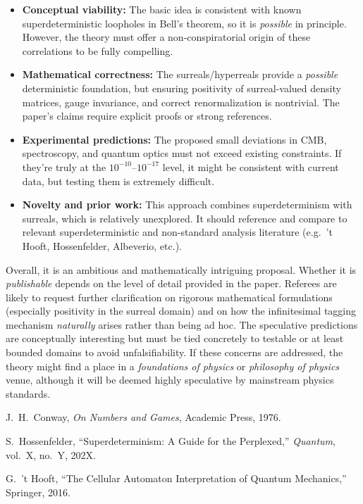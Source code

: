 \documentclass[11pt]{article}
\begin{document}
\begin{itemize}
  \item \textbf{Conceptual viability:} The basic idea is consistent with known superdeterministic loopholes in Bell’s theorem, so it is \emph{possible} in principle. However, the theory must offer a non-conspiratorial origin of these correlations to be fully compelling.
  \item \textbf{Mathematical correctness:} The surreals/hyperreals provide a \emph{possible} deterministic foundation, but ensuring positivity of surreal-valued density matrices, gauge invariance, and correct renormalization is nontrivial. The paper’s claims require explicit proofs or strong references.
  \item \textbf{Experimental predictions:} The proposed small deviations in CMB, spectroscopy, and quantum optics must not exceed existing constraints. If they’re truly at the $10^{-10}$--$10^{-17}$ level, it might be consistent with current data, but testing them is extremely difficult.
  \item \textbf{Novelty and prior work:} This approach combines superdeterminism with surreals, which is relatively unexplored. It should reference and compare to relevant superdeterministic and non-standard analysis literature (e.g.\ 't Hooft, Hossenfelder, Albeverio, etc.).
\end{itemize}

\noindent Overall, it is an ambitious and mathematically intriguing proposal. Whether it is \emph{publishable} depends on the level of detail provided in the paper. Referees are likely to request further clarification on rigorous mathematical formulations (especially positivity in the surreal domain) and on how the infinitesimal tagging mechanism \emph{naturally} arises rather than being ad hoc. The speculative predictions are conceptually interesting but must be tied concretely to testable or at least bounded domains to avoid unfalsifiability. If these concerns are addressed, the theory might find a place in a \emph{foundations of physics} or \emph{philosophy of physics} venue, although it will be deemed highly speculative by mainstream physics standards.

\begin{thebibliography}{9}

 J.~H.~Conway, \emph{On Numbers and Games}, Academic Press, 1976.

 S.~Hossenfelder, ``Superdeterminism: A Guide for the Perplexed,'' \emph{Quantum}, vol.~X, no.~Y, 202X.

 G.~'t Hooft, ``The Cellular Automaton Interpretation of Quantum Mechanics,'' Springer, 2016.

\end{thebibliography}
\end{document}
